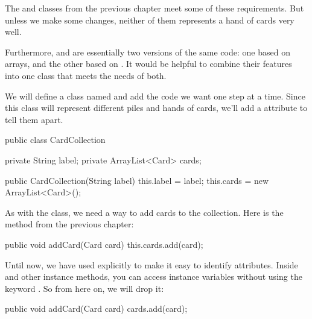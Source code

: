 The  and  classes from the previous chapter meet some of these requirements.
But unless we make some changes, neither of them represents a hand of cards very well.


Furthermore,  and  are essentially two versions of the same code: one based on arrays, and the other based on .
It would be helpful to combine their features into one class that meets the needs of both.

We will define a class named  and add the code we want one step at a time.
Since this class will represent different piles and hands of cards, we'll add a  attribute to tell them apart.


\begin{code}
public class CardCollection {

    private String label;
    private ArrayList<Card> cards;

    public CardCollection(String label) {
        this.label = label;
        this.cards = new ArrayList<Card>();
    }
}
\end{code}


As with the  class, we need a way to add cards to the collection.
Here is the  method from the previous chapter:

\begin{code}
public void addCard(Card card) {
    this.cards.add(card);
}
\end{code}


Until now, we have used  explicitly to make it easy to identify attributes.
Inside  and other instance methods, you can access instance variables without using the keyword .
So from here on, we will drop it:

\begin{code}
public void addCard(Card card) {
    cards.add(card);
}
\end{code}

